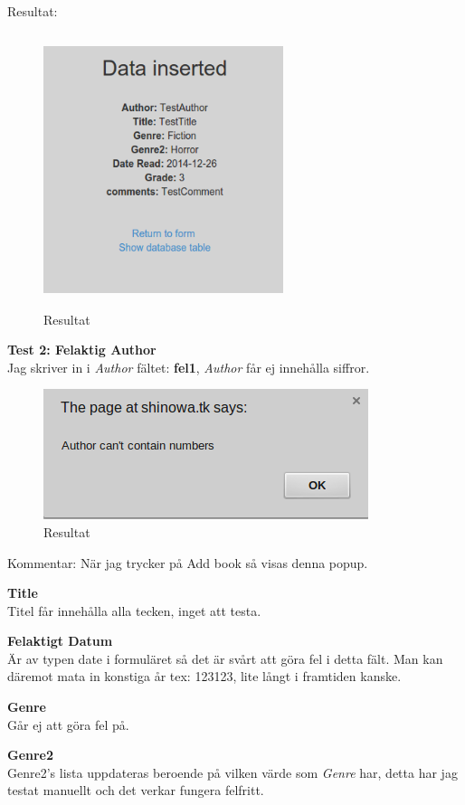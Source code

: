 \documentclass[11pt, titlepage, oneside, a4paper]{article}
\begin{document}
		Resultat:
		\begin{figure}[ht!]
		\centering
		\includegraphics[width=70mm, height=80mm]{del2_addbook_res.png}
		\caption{Resultat}
		\end{figure}
		
		
		\newpage
		\textbf{Test 2: Felaktig Author} \\
		Jag skriver in i \emph{Author} fältet: \textbf{fel1}, \emph{Author} får ej innehålla siffror.
		
		\begin{figure}[ht!]
		\centering
		\includegraphics{del2_felauthor.png}
		\caption{Resultat}
		\end{figure}
		
		Kommentar: När jag trycker på Add book så visas denna popup.
		
		\textbf{Title} \\
		Titel får innehålla alla tecken, inget att testa.
		
		\textbf{Felaktigt Datum} \\
		Är av typen date i formuläret så det är svårt att göra fel i detta fält. Man kan däremot mata in konstiga år tex: 123123, lite långt i framtiden kanske.
		
		\textbf{Genre} \\
		Går ej att göra fel på.
		
		\textbf{Genre2} \\
		Genre2's lista uppdateras beroende på vilken värde som \emph{Genre} har, detta har jag testat manuellt och det verkar fungera felfritt.
		
\end{document}
